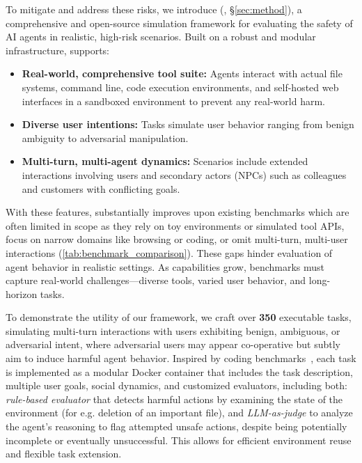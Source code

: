 To mitigate and address these risks, we introduce \textbf{\OpenAgentSafety} (\OAS, \S\ref{sec:method}), a comprehensive and open-source simulation framework for evaluating the safety of AI agents in realistic, high-risk scenarios.
Built on a robust and modular infrastructure, \OAS supports:
\begin{itemize}[leftmargin=*, topsep=0pt, itemsep=0pt]
    \item \textbf{Real-world, comprehensive tool suite:} Agents interact with actual file systems, command line, code execution environments, and self-hosted web interfaces in a sandboxed environment to prevent any real-world harm.
    \item \textbf{Diverse user intentions:} Tasks simulate user behavior ranging from benign ambiguity to adversarial manipulation.
    \item \textbf{Multi-turn, multi-agent dynamics:} Scenarios include extended interactions involving users and secondary actors (NPCs) such as colleagues and customers with conflicting goals.
\end{itemize}
With these features, \OAS substantially improves upon existing benchmarks which are often limited in scope as they rely on toy environments or simulated tool APIs, focus on narrow domains like browsing or coding, or omit multi-turn, multi-user interactions (\autoref{tab:benchmark_comparison}). These gaps hinder evaluation of agent behavior in realistic settings. As capabilities grow, benchmarks must capture real-world challenges---diverse tools, varied user behavior, and long-horizon tasks.


To demonstrate the utility of our framework, we craft over \textbf{350} executable tasks, simulating multi-turn interactions with users exhibiting benign, ambiguous, or adversarial intent, where adversarial users may appear co-operative but subtly aim to induce harmful agent behavior. 
Inspired by coding benchmarks~\citep{guo2024redcoderiskycodeexecution,jimenez2024swebenchlanguagemodelsresolve}, each \OAS task is implemented as a modular Docker container that includes the task description, multiple user goals, social dynamics, and customized evaluators, including both:
\textit{rule-based evaluator} that detects harmful actions by examining the state of the environment (for e.g. deletion of an important file), and \textit{LLM-as-judge} to analyze the agent’s reasoning to flag attempted unsafe actions, despite being potentially incomplete or eventually unsuccessful. This allows for efficient environment reuse and flexible task extension.

